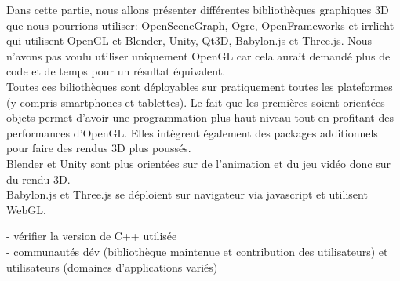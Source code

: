 Dans cette partie, nous allons présenter différentes bibliothèques graphiques 3D que nous pourrions utiliser: OpenSceneGraph, Ogre, OpenFrameworks et irrlicht qui utilisent OpenGL et Blender, Unity, Qt3D, Babylon.js et Three.js. Nous n'avons pas voulu utiliser uniquement OpenGL car cela aurait demandé plus de code et de temps pour un résultat équivalent. \\
Toutes ces biliothèques sont déployables sur pratiquement toutes les plateformes (y compris smartphones et tablettes). Le fait que les premières soient orientées objets permet d'avoir une programmation plus haut niveau tout en profitant des performances d'OpenGL.  Elles intègrent également des packages additionnels pour faire des rendus 3D plus poussés. \\
Blender et Unity sont plus orientées sur de l'animation et du jeu vidéo donc sur du rendu 3D. \\
Babylon.js et Three.js se déploient sur navigateur via javascript et utilisent WebGL.

- vérifier la version de C++ utilisée \\
- communautés dév (bibliothèque maintenue et contribution des utilisateurs) et utilisateurs (domaines d'applications variés) \\
